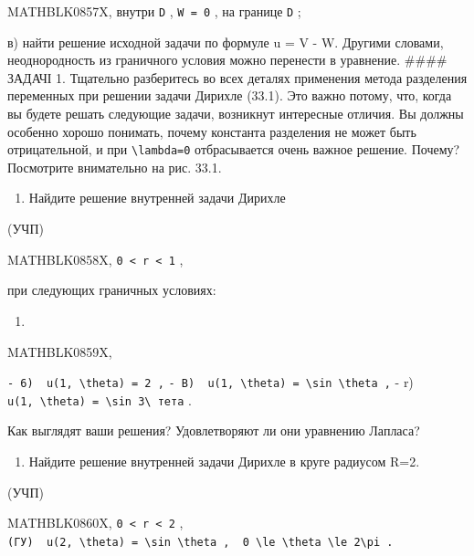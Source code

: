 \documentclass[
  ukrainian,
]{article}
\providecommand{\tightlist}{%
  \setlength{\itemsep}{0pt}\setlength{\parskip}{0pt}}
\begin{document}
MATHBLK0857X, внутри \texttt{D} , \texttt{W\ =\ 0} , на границе
\texttt{D} ;

в) найти решение исходной задачи по формуле u = V - W. Другими словами,
неоднородность из граничного условия можно перенести в уравнение.
\#\#\#\# ЗАДАЧІ 1. Тщательно разберитесь во всех деталях применения
метода разделения переменных при решении задачи Дирихле (33.1). Это
важно потому, что, когда вы будете решать следующие задачи, возникнут
интересные отличия. Вы должны особенно хорошо понимать, почему константа
разделения не может быть отрицательной, и при
\texttt{\textbackslash{}lambda=0} отбрасывается очень важное решение.
Почему? Посмотрите внимательно на рис. 33.1.

\begin{enumerate}
\def\labelenumi{\arabic{enumi}.}
\setcounter{enumi}{1}
\tightlist
\item
  Найдите решение внутренней задачи Дирихле
\end{enumerate}

(УЧП)

MATHBLK0858X, \texttt{0\ \textless{}\ r\ \textless{}\ 1} ,

при следующих граничных условиях:

\begin{enumerate}
\def\labelenumi{\alph{enumi})}
\tightlist
\item
\end{enumerate}

MATHBLK0859X,

\texttt{-\ 6)\ \ \textquotesingle{}u(1,\ \textbackslash{}theta)\ =\ 2\textquotesingle{}\ ,}
\texttt{-\ B)\ \ \textquotesingle{}u(1,\ \textbackslash{}theta)\ =\ \textbackslash{}sin\ \textbackslash{}theta\textquotesingle{}\ ,}
- r)
\texttt{u(1,\ \textbackslash{}theta)\ =\ \textbackslash{}sin\ 3\textbackslash{}\ тета}
.

Как выглядят ваши решения? Удовлетворяют ли они уравнению Лапласа?

\begin{enumerate}
\def\labelenumi{\arabic{enumi}.}
\setcounter{enumi}{2}
\tightlist
\item
  Найдите решение внутренней задачи Дирихле в круге радиусом R=2.
\end{enumerate}

(УЧП)

MATHBLK0860X, \texttt{0\ \textless{}\ r\ \textless{}\ 2} ,\\
\texttt{(ГУ)\ \ \textquotesingle{}u(2,\ \textbackslash{}theta)\ =\ \textbackslash{}sin\ \textbackslash{}theta\textquotesingle{}\ ,\ \ \textquotesingle{}0\ \textbackslash{}le\ \textbackslash{}theta\ \textbackslash{}le\ 2\textbackslash{}pi\textquotesingle{}\ .}
\end{document}
